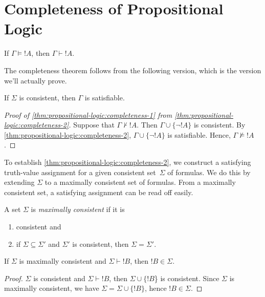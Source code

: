 \documentclass[propositional-logic]{subfiles}
\begin{document}
\section{Completeness of Propositional Logic}


\begin{thm}\label{thm:propositional-logic:completeness-1}
If $\Gamma \models !A$, then $\Gamma \vdash !A$.
\end{thm}

The completeness theorem follows from the following version, which is
the version we'll actually prove.

\begin{thm}\label{thm:propositional-logic:completeness-2}
If $\Sigma$ is consistent, then $\Gamma$ is satisfiable.
\end{thm}

\begin{proof}[Proof 
of \ref{thm:propositional-logic:completeness-1} from
\ref{thm:propositional-logic:completeness-2}]

Suppose that $\Gamma \not\vdash !A$.  Then $\Gamma \cup \{\lnot !A\}$
is consistent.  By \ref{thm:propositional-logic:completeness-2},
$\Gamma \cup \{\lnot !A\}$ is satisfiable.  Hence, $\Gamma \not\models
!A$.
\end{proof}

To establish \ref{thm:propositional-logic:completeness-2}, we
construct a satisfying truth-value assignment for a given consistent
set~$\Sigma$ of formulas.  We do this by extending $\Sigma$ to a
maximally consistent set of formulas.  From a maximally consistent
set, a satisfying assignment can be read off easily.

\begin{defn} 
A set $\Sigma$ is \emph{maximally consistent} if it is
\begin{enumerate}
\item consistent and
\item if $\Sigma \subseteq \Sigma'$ and $\Sigma'$ is consistent, then
  $\Sigma = \Sigma'$.
\end{enumerate}
\end{defn}

\begin{lem}
If $\Sigma$ is maximally consistent and $\Sigma \vdash !B$, then $!B
\in \Sigma$.
\end{lem}

\begin{proof} 
$\Sigma$ is consistent and $\Sigma \vdash !B$, then $\Sigma \cup
  \{!B$\} is consistent.  Since $\Sigma$ is maximally consistent, we
  have $\Sigma = \Sigma \cup \{ !B \}$, hence $!B \in \Sigma$.
\end{proof}
\end{document}
